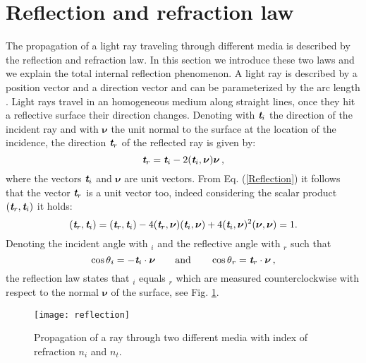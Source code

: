 \section{Reflection and refraction law}
The propagation of a light ray traveling through  different media is described by the reflection and refraction law.
In this section we introduce these two laws and we explain the total internal reflection phenomenon.
A light ray is described by a position vector  and a direction vector  and can be parameterized by the arc length .
Light rays travel in an homogeneous medium along straight lines, once they hit a reflective surface their direction changes.
 Denoting with $\textit{\textbf{t}}_i$ the direction of the incident ray and with $\boldsymbol{\nu}$ the unit normal to the surface at the location of the incidence, the direction $\textit{\textbf{t}}_r$ of the reflected ray is given by:
 \begin{equation}\label{Reflection}
  \textit{\textbf{t}}_r = \textit{\textbf{t}}_i-2(\textit{\textbf{t}}_i,\boldsymbol{\nu})\boldsymbol{\nu}\,,
\end{equation}
where the vectors $\textit{\textbf{t}}_i$ and $\boldsymbol{\nu}$ are unit vectors. 
From Eq. (\ref{Reflection}) it follows that the vector  $\textit{\textbf{t}}_r$ is a unit vector too, indeed considering the scalar product $(\textit{\textbf{t}}_r,\textit{\textbf{t}}_i)$ it holds:
\begin{equation}\label{unit_vector}
(\textit{\textbf{t}}_r,\textit{\textbf{t}}_i) = (\textit{\textbf{t}}_r,\textit{\textbf{t}}_i) - 4(\textit{\textbf{t}}_r,\boldsymbol{\nu})(\textit{\textbf{t}}_i,\boldsymbol{\nu})+
4(\textit{\textbf{t}}_i,\boldsymbol{\nu})^2(\boldsymbol{\nu},\boldsymbol{\nu})=1 .
\end{equation} 
Denoting the incident angle with \myangle$_i$ and the reflective angle with \myangle$_r$ such that
\begin{equation}
\cos{\mbox{$\theta$}_i} = -\textit{\textbf{t}}_i\cdot \boldsymbol{\nu} \qquad \mbox{and} \qquad \cos{\mbox{$\theta$}_r} = \textit{\textbf{t}}_r \cdot\boldsymbol{\nu}\,,
\end{equation}
the reflection law states that \myangle$_i$ equals \myangle$_r$ which are measured counterclockwise with respect to the normal $\boldsymbol{\nu}$ of the surface, see Fig. \ref{fig:Snell}.
\begin{figure}[h]
 \label{fig:Snell}
     \begin{center}
     \texttt{[image: reflection]}
     \end{center}
     \caption{\footnotesize{Propagation of a ray through two different media with index of refraction $n_i$ and $n_t$.}}%
\label{fig:Snell}
 \end{figure}

